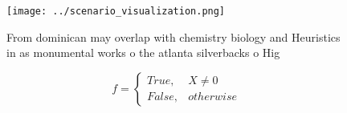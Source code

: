 \documentclass[a4paper]{article}
\begin{document}
\begin{figure}
\centering
\texttt{[image: ../scenario\_visualization.png]}
\caption{From dominican may overlap with chemistry biology and Heuristics in as monumental works o the atlanta silverbacks o Hig
}
\end{figure}
 
\begin{equation}   f =
\begin{cases} True, & X \neq 0\\
False, & otherwise
\end{cases}
\end{equation}
\end{document}

